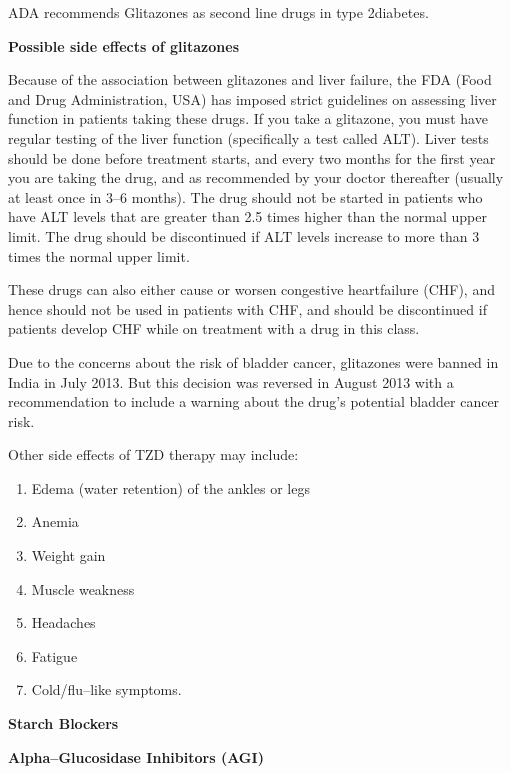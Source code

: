 ADA recommends Glitazones as second line drugs in type 2\break diabetes.

\vskip 5pt

\noindent\textbf{Possible side effects of glitazones}

Because of the association between glitazones and liver failure, the FDA (Food and Drug Administration, USA) has imposed strict guidelines on assessing liver function in patients taking these drugs. If you take a glitazone, you must have regular testing of the liver function (specifically a test called ALT). Liver tests should be done before treatment starts, and every two months for the first year you are taking the drug, and as recommended by your doctor thereafter (usually at least once in 3–6 months). The drug should not be started in patients who have ALT levels that are greater than 2.5 times higher than the normal upper limit. The drug should be discontinued if ALT levels increase to more than 3 times the normal upper limit.

These drugs can also either cause or worsen congestive heart\break failure (CHF), and hence should not be used in patients with CHF, and should be discontinued if patients develop CHF while on treatment with a drug in this class.

Due to the concerns about the risk of bladder cancer, glitazones were banned in India in July 2013. But this decision was reversed in August 2013 with a recommendation to include a warning about the drug’s potential bladder cancer risk.

\noindent Other side effects of TZD therapy may include:

\vspace{-\topsep}
\begin{enumerate}[•]
\itemsep=0pt
\item Edema (water retention) of the ankles or legs
\item Anemia
\item Weight gain
\item Muscle weakness
\item Headaches
\item Fatigue
\item Cold/flu–like symptoms.
\end{enumerate}
\vspace{-\topsep}

\textbf{Starch Blockers}

\textbf{Alpha–Glucosidase Inhibitors (AGI)}

